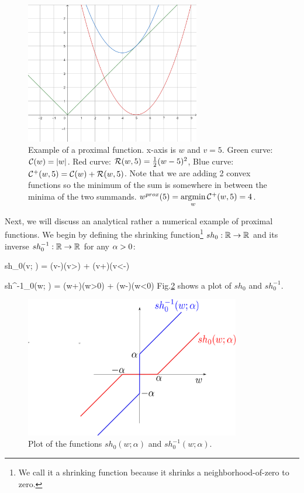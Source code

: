\begin{figure}[h!]
\centering
\includegraphics[width=3in]
{regularization/proximal-example.png}
\caption{Example of a proximal
function. x-axis is $w$ and $v=5$. Green curve: ${\cal C}(w)=|w|$. Red curve: ${\cal R}(w, 5)=\frac{1}{2}(w-5)^2$, Blue curve: ${\cal C}^+(w, 5)={\cal C}(w)+{\cal R}(w,5)$. Note that we are adding 2 convex functions so the minimum of the sum is somewhere in between the minima of the two summands.
$w^{prox}(5) =\mathop{\mathrm{argmin}}\limits_w
{\cal C}^+(w, 5)=4$.
}
\label{fig-proximal-example}
\end{figure}

Next, we will discuss an
analytical rather a numerical
example of proximal functions.
We  begin by defining the
shrinking function\footnote{We call it a
shrinking function because
it shrinks a neighborhood-of-zero to zero.}
 $sh_0: { \mathbb{R}}\rightarrow { \mathbb{R}}$ and its inverse
$sh_0^{-1}:{ \mathbb{R}}\rightarrow{ \mathbb{R}}$  for any $\alpha>0$:

\beq
sh_0(v; \alp) = (v-\alp)\indi(v>\alp) + (v+\alp)\indi(v<-\alp)
\eeq

\beq
sh^{-1}_0(w; \alp) = (w+\alp)\indi(w>0) + (w-\alp)\indi(w<0)
\eeq
Fig.\ref{fig-sh_0_w}
shows a plot of $sh_0$ and
$sh^{-1}_0$.


\begin{figure}[h!]
\centering
\includegraphics[width=3.7in]
{regularization/sh_0_w.png}
\caption{Plot
of the functions $sh_0(w; \alpha)$ and $sh_0^{-1}(w; \alpha)$.
}
\label{fig-sh_0_w}
\end{figure}

